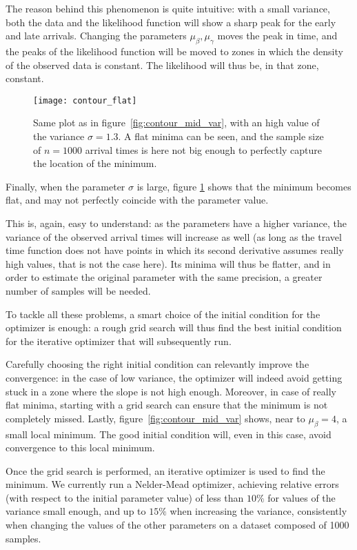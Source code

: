 The reason behind this phenomenon is quite intuitive:
with a small variance, both the data and the likelihood function will show a sharp peak for the early and late arrivals.
Changing the parameters \(\mu_\beta, \mu_\gamma\) moves the peak in time,
and the peaks of the likelihood function will be moved to zones in which the density of the observed data is constant.
The likelihood will thus be, in that zone, constant.

\begin{figure}
  \centering
  \texttt{[image: contour\_flat]}
  \caption{Same plot as in figure~\ref{fig:contour_mid_var},
    with an high value of the variance \(\sigma = 1.3\).
  A flat minima can be seen, and the sample size of \(n = 1000\) arrival times is here not big enough to perfectly capture the location of the minimum.}
  \label{fig:contour_high_var}
\end{figure}

Finally, when the parameter \(\sigma\) is large,
figure \ref{fig:contour_high_var} shows that the minimum becomes flat,
and may not perfectly coincide with the parameter value.

This is, again, easy to understand:
as the parameters have a higher variance,
the variance of the observed arrival times will increase as well
(as long as the travel time function does not have points in which its second derivative assumes really high values, that is not the case here).
Its minima will thus be flatter,
and in order to estimate the original parameter with the same precision,
a greater number of samples will be needed.

To tackle all these problems, a smart choice of the initial condition for the optimizer is enough:
a rough grid search will thus find the best initial condition for the iterative optimizer that will subsequently run.

Carefully choosing the right initial condition can relevantly improve the convergence:
in the case of low variance,
the optimizer will indeed avoid getting stuck in a zone where the slope is not high enough.
Moreover, in case of really flat minima,
starting with a grid search can ensure that the minimum is not completely missed.
Lastly, figure~\ref{fig:contour_mid_var} shows, near to \(\mu_\beta = 4\),
a small local minimum.
The good initial condition will, even in this case, avoid convergence to this local minimum.

Once the grid search is performed,
an iterative optimizer is used to find the minimum.
We currently run a Nelder-Mead optimizer,
achieving relative errors (with respect to the initial parameter value)
of less than \(10\%\) for values of the variance small enough,
and up to \(15\%\) when increasing the variance,
consistently when changing the values of the other parameters on a dataset composed of 1000 samples.

